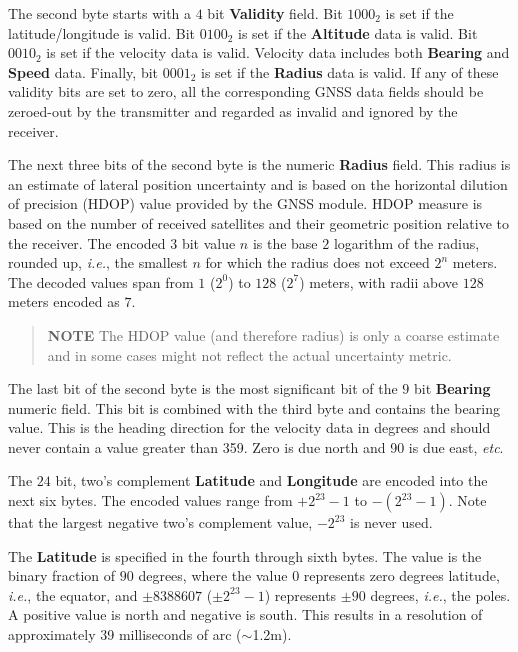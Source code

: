 \documentclass[a4paper,11pt,oneside]{book}
\begin{document}
The second byte starts with a $4$ bit \textbf{Validity} field. Bit $1000_2$ is set if the latitude/longitude is valid. Bit $0100_2$ is set if the \textbf{Altitude} data is valid. Bit $0010_2$ is set if the velocity data is valid. Velocity data includes both \textbf{Bearing} and \textbf{Speed} data. Finally, bit $0001_2$ is set if the \textbf{Radius} data is valid. If any of these validity bits are set to zero, all the corresponding GNSS data fields should be zeroed-out by the transmitter and regarded as invalid and ignored by the receiver.

The next three bits of the second byte is the numeric \textbf{Radius} field. This radius is an estimate of lateral position uncertainty and is based on the horizontal dilution of precision (HDOP) value provided by the GNSS module. HDOP measure is based on the number of received satellites and their geometric position relative to the receiver.
The encoded $3$ bit value $n$ is the base $2$ logarithm of the radius, rounded up, \textit{i.e.}, the smallest $n$ for which the radius does not exceed $2^n$ meters. The decoded values span from $1$ ($2^0$) to $128$ ($2^7$) meters, with radii above $128$ meters encoded as $7$.
\begin{quote}
	\textbf{NOTE} The HDOP value (and therefore radius) is only a coarse estimate and in some cases might not reflect the actual uncertainty metric.
\end{quote}

The last bit of the second byte is the most significant bit of the $9$ bit \textbf{Bearing} numeric field. This bit is combined with the third byte and contains the bearing value. This is the heading direction for the velocity data in degrees and should never contain a value greater than 359. Zero is due north and 90 is due east, \textit{etc}.

The $24$ bit, two's complement \textbf{Latitude} and \textbf{Longitude} are encoded into the next six bytes. The encoded values range from $+2^{23}-1$ to $-(2^{23}-1)$. Note that the largest negative two's complement value, $-2^{23}$ is never used.

The \textbf{Latitude} is specified in the fourth through sixth bytes. The value is the binary fraction of $90$ degrees, where the value $0$ represents zero degrees latitude, \textit{i.e.}, the equator, and $\pm8388607$ ($\pm2^{23}-1$) represents $\pm90$ degrees, \textit{i.e.}, the poles. A positive value is north and negative is south. This results in a resolution of approximately 39 milliseconds of arc ($\sim$1.2m).
\end{document}
